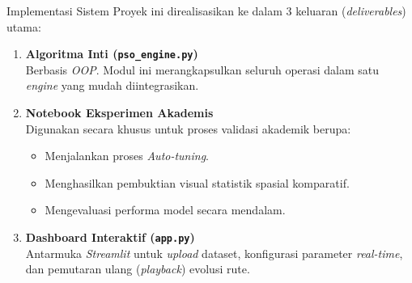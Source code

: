 \documentclass[aspectratio=169,10pt]{beamer}
\begin{document}
\begin{frame}{Implementasi Sistem}
  Proyek ini direalisasikan ke dalam 3 keluaran (\textit{deliverables}) utama:

  \vspace{0.4cm}
  \begin{enumerate}
    \item \textbf{Algoritma Inti (\texttt{pso\_engine.py})}\\
    Berbasis \textit{OOP}. Modul ini merangkapsulkan seluruh operasi dalam satu \textit{engine} yang mudah diintegrasikan.
    
    \vspace{0.3cm}
    \item \textbf{Notebook Eksperimen Akademis}\\
    Digunakan secara khusus untuk proses validasi akademik berupa:
    \begin{itemize}
      \item Menjalankan proses \textit{Auto-tuning}.
      \item Menghasilkan pembuktian visual statistik spasial komparatif.
      \item Mengevaluasi performa model secara mendalam.
    \end{itemize}

    \vspace{0.3cm}
    \item \textbf{Dashboard Interaktif (\texttt{app.py})}\\
    Antarmuka \textit{Streamlit} untuk \textit{upload} dataset, konfigurasi parameter \textit{real-time}, dan pemutaran ulang (\textit{playback}) evolusi rute.
  \end{enumerate}
\end{frame}
\end{document}
